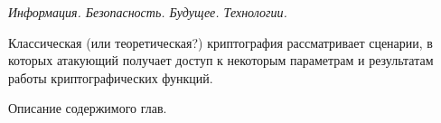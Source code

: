 { \it Информация. Безопасность. Будущее. Технологии. }

Классическая (или теоретическая?) криптография рассматривает сценарии, в
которых атакующий получает доступ к некоторым параметрам и результатам работы
криптографических функций.

Описание содержимого глав.

